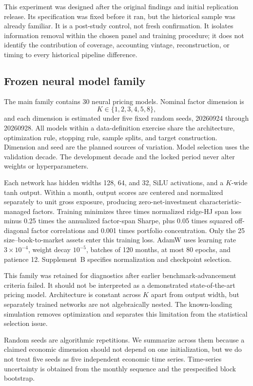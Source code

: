 This experiment was designed after the original findings and initial replication release. Its specification was fixed before it ran, but the historical sample was already familiar. It is a post-study control, not fresh confirmation. It isolates information removal within the chosen panel and training procedure; it does not identify the contribution of coverage, accounting vintage, reconstruction, or timing to every historical pipeline difference.

\subsection{Frozen neural model family}

The main family contains 30 neural pricing models. Nominal factor dimension is
\[
 K\in\{1,2,3,4,5,8\},
\]
and each dimension is estimated under five fixed random seeds, 20260924 through 20260928. All models within a data-definition exercise share the architecture, optimization rule, stopping rule, sample splits, and target construction. Dimension and seed are the planned sources of variation. Model selection uses the validation decade. The development decade and the locked period never alter weights or hyperparameters.

Each network has hidden widths 128, 64, and 32, SiLU activations, and a $K$-wide tanh output. Within a month, output scores are centered and normalized separately to unit gross exposure, producing zero-net-investment characteristic-managed factors. Training minimizes three times normalized ridge-HJ span loss minus 0.25 times the annualized factor-span Sharpe, plus 0.05 times squared off-diagonal factor correlations and 0.001 times portfolio concentration. Only the 25 size--book-to-market assets enter this training loss. AdamW uses learning rate $3\times10^{-4}$, weight decay $10^{-5}$, batches of 120 months, at most 80 epochs, and patience 12. Supplement~B specifies normalization and checkpoint selection.

This family was retained for diagnostics after earlier benchmark-advancement criteria failed. It should not be interpreted as a demonstrated state-of-the-art pricing model. Architecture is constant across $K$ apart from output width, but separately trained networks are not algebraically nested. The known-loading simulation removes optimization and separates this limitation from the statistical selection issue.

Random seeds are algorithmic repetitions. We summarize across them because a claimed economic dimension should not depend on one initialization, but we do not treat five seeds as five independent economic time series. Time-series uncertainty is obtained from the monthly sequence and the prespecified block bootstrap.

